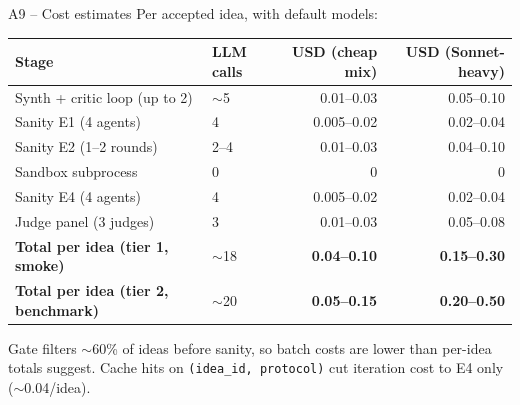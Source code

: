 \documentclass[10pt,aspectratio=169]{beamer}
\begin{document}
\begin{frame}{A9 -- Cost estimates}
  Per accepted idea, with default models:
  \scriptsize
  \begin{table}\centering
    \begin{tabular}{@{}l l r r@{}}
      \toprule
      Stage & LLM calls & USD (cheap mix) & USD (Sonnet-heavy) \\
      \midrule
      Synth + critic loop (up to 2) & $\sim$5 & 0.01--0.03 & 0.05--0.10 \\
      Sanity E1 (4 agents)          & 4       & 0.005--0.02 & 0.02--0.04 \\
      Sanity E2 (1--2 rounds)       & 2--4    & 0.01--0.03  & 0.04--0.10 \\
      Sandbox subprocess            & 0       & 0           & 0          \\
      Sanity E4 (4 agents)          & 4       & 0.005--0.02 & 0.02--0.04 \\
      Judge panel (3 judges)        & 3       & 0.01--0.03  & 0.05--0.08 \\
      \midrule
      \textbf{Total per idea (tier 1, smoke)} & $\sim$18 & \textbf{0.04--0.10} & \textbf{0.15--0.30} \\
      \textbf{Total per idea (tier 2, benchmark)} & $\sim$20 & \textbf{0.05--0.15} & \textbf{0.20--0.50} \\
      \bottomrule
    \end{tabular}
  \end{table}

  \vspace{0.5em}
  \footnotesize Gate filters $\sim$60\% of ideas before sanity, so batch costs
  are lower than per-idea totals suggest. Cache hits on
  \texttt{(idea\_id, protocol)} cut iteration cost to E4 only ($\sim$0.04/idea).
\end{frame}
\end{document}
